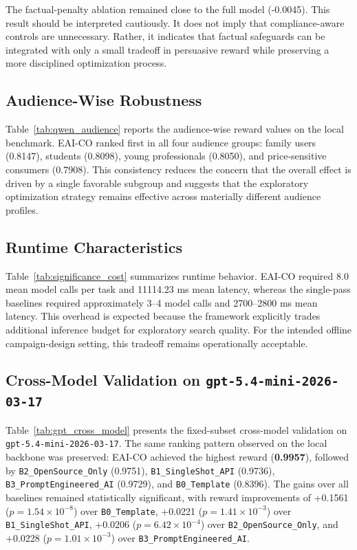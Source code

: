 \documentclass[applsci,article,submit,pdftex,moreauthors]{Definitions/mdpi}
\begin{document}
The factual-penalty ablation remained close to the full model (-0.0045). This result should be interpreted cautiously. It does not imply that compliance-aware controls are unnecessary. Rather, it indicates that factual safeguards can be integrated with only a small tradeoff in persuasive reward while preserving a more disciplined optimization process.

\subsection{Audience-Wise Robustness}

Table~\ref{tab:qwen_audience} reports the audience-wise reward values on the local benchmark. EAI-CO ranked first in all four audience groups: family users (0.8147), students (0.8098), young professionals (0.8050), and price-sensitive consumers (0.7908). This consistency reduces the concern that the overall effect is driven by a single favorable subgroup and suggests that the exploratory optimization strategy remains effective across materially different audience profiles.

\subsection{Runtime Characteristics}

Table~\ref{tab:significance_cost} summarizes runtime behavior. EAI-CO required 8.0 mean model calls per task and 11114.23 ms mean latency, whereas the single-pass baselines required approximately 3--4 model calls and 2700--2800 ms mean latency. This overhead is expected because the framework explicitly trades additional inference budget for exploratory search quality. For the intended offline campaign-design setting, this tradeoff remains operationally acceptable.

\subsection{Cross-Model Validation on \texttt{gpt-5.4-mini-2026-03-17}}

Table~\ref{tab:gpt_cross_model} presents the fixed-subset cross-model validation on \texttt{gpt-5.4-mini-2026-03-17}. The same ranking pattern observed on the local backbone was preserved: EAI-CO achieved the highest reward (\textbf{0.9957}), followed by \texttt{B2\_OpenSource\_Only} (0.9751), \texttt{B1\_SingleShot\_API} (0.9736), \texttt{B3\_PromptEngineered\_AI} (0.9729), and \texttt{B0\_Template} (0.8396). The gains over all baselines remained statistically significant, with reward improvements of +0.1561 ($p = 1.54 \times 10^{-8}$) over \texttt{B0\_Template}, +0.0221 ($p = 1.41 \times 10^{-3}$) over \texttt{B1\_SingleShot\_API}, +0.0206 ($p = 6.42 \times 10^{-4}$) over \texttt{B2\_OpenSource\_Only}, and +0.0228 ($p = 1.01 \times 10^{-3}$) over \texttt{B3\_PromptEngineered\_AI}.
\end{document}
